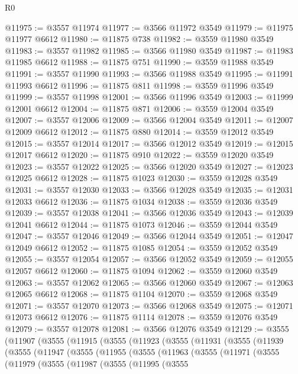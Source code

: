 \begin{lexlean}{R0}
\begin{coremodule}
@11975 := @3557 @11974
@11977 := @3566 @11972 @3549
@11979 := @11975 @11977 @6612
@11980 := @11875 @738
@11982 := @3559 @11980 @3549
@11983 := @3557 @11982
@11985 := @3566 @11980 @3549
@11987 := @11983 @11985 @6612
@11988 := @11875 @751
@11990 := @3559 @11988 @3549
@11991 := @3557 @11990
@11993 := @3566 @11988 @3549
@11995 := @11991 @11993 @6612
@11996 := @11875 @811
@11998 := @3559 @11996 @3549
@11999 := @3557 @11998
@12001 := @3566 @11996 @3549
@12003 := @11999 @12001 @6612
@12004 := @11875 @871
@12006 := @3559 @12004 @3549
@12007 := @3557 @12006
@12009 := @3566 @12004 @3549
@12011 := @12007 @12009 @6612
@12012 := @11875 @880
@12014 := @3559 @12012 @3549
@12015 := @3557 @12014
@12017 := @3566 @12012 @3549
@12019 := @12015 @12017 @6612
@12020 := @11875 @910
@12022 := @3559 @12020 @3549
@12023 := @3557 @12022
@12025 := @3566 @12020 @3549
@12027 := @12023 @12025 @6612
@12028 := @11875 @1023
@12030 := @3559 @12028 @3549
@12031 := @3557 @12030
@12033 := @3566 @12028 @3549
@12035 := @12031 @12033 @6612
@12036 := @11875 @1034
@12038 := @3559 @12036 @3549
@12039 := @3557 @12038
@12041 := @3566 @12036 @3549
@12043 := @12039 @12041 @6612
@12044 := @11875 @1073
@12046 := @3559 @12044 @3549
@12047 := @3557 @12046
@12049 := @3566 @12044 @3549
@12051 := @12047 @12049 @6612
@12052 := @11875 @1085
@12054 := @3559 @12052 @3549
@12055 := @3557 @12054
@12057 := @3566 @12052 @3549
@12059 := @12055 @12057 @6612
@12060 := @11875 @1094
@12062 := @3559 @12060 @3549
@12063 := @3557 @12062
@12065 := @3566 @12060 @3549
@12067 := @12063 @12065 @6612
@12068 := @11875 @1104
@12070 := @3559 @12068 @3549
@12071 := @3557 @12070
@12073 := @3566 @12068 @3549
@12075 := @12071 @12073 @6612
@12076 := @11875 @1114
@12078 := @3559 @12076 @3549
@12079 := @3557 @12078
@12081 := @3566 @12076 @3549
@12129 := @3555
    (@11907
      (@3555
        (@11915
          (@3555
            (@11923
              (@3555
                (@11931
                  (@3555
                    (@11939
                      (@3555
                        (@11947
                          (@3555
                            (@11955
                              (@3555
                                (@11963
                                  (@3555
                                    (@11971
                                      (@3555
                                        (@11979
                                          (@3555
                                            (@11987
                                              (@3555
                                                (@11995
                                                  (@3555

\end{coremodule}
\end{lexlean}
